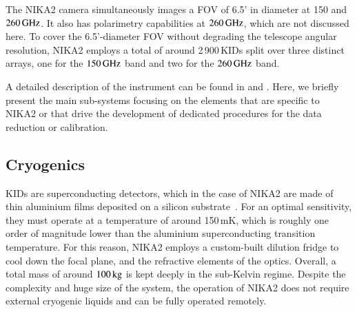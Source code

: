 \documentclass[traditionalabstract]{aa}
\newcommand{\lp}[1]{#1}
\begin{document}
The NIKA2 camera simultaneously images a FOV of
6.5' in diameter at 150 and $260\,\rm{GHz}$. It also has polarimetry
capabilities at  $260\,\rm{GHz}$, which are not discussed here. 
To cover the 6.5'-diameter FOV without degrading the
telescope angular resolution, NIKA2 employs a total of around
2\,900\,KIDs split over three distinct arrays, one for the $150\,\rm{GHz}$
band and two for the $260\,\rm{GHz}$ band.

A detailed description of the instrument can be found in
\citet{Adam2018} and \citet{Calvo2016JLTP}. Here, we briefly present the main sub-systems
focusing on the elements that are specific to NIKA2
or that drive the development of dedicated procedures for the data
reduction or calibration.

\subsection{Cryogenics}

{\lp KIDs are superconducting detectors, which in the case of NIKA2 are made of
thin aluminium films deposited on a silicon substrate~\citep{Roesch2012_LEKID}.
For an optimal sensitivity, they must operate at a temperature of
around 150\,mK, which is roughly one order of magnitude lower than the
aluminium superconducting transition temperature.}  
For this reason,
NIKA2 employs a custom-built dilution fridge to cool down the focal plane, and the
refractive elements of the optics. Overall, a total mass of around
$100\, \rm{kg}$ is kept deeply in the sub-Kelvin regime. Despite the complexity
and huge size of the system, the operation of NIKA2 does not require
external cryogenic liquids and can be fully operated remotely.
\end{document}
